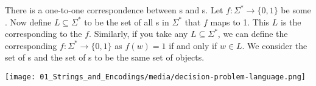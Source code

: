 \begin{important} \label{important:Correspondence-between-decision-problems-and-languages}
There is a one-to-one correspondence between s and s. Let $f:\Sigma^* \to \{0,1\}$ be some . Now define $L \subseteq \Sigma^*$ to be the set of all s in $\Sigma^*$ that $f$ maps to 1. This $L$ is the  corresponding to the  $f$. Similarly, if you take any  $L \subseteq \Sigma^*$, we can define the corresponding  $f:\Sigma^* \to \{0,1\}$ as $f(w) = 1$ if and only if $w \in L$. We consider the set of s and the set of s to be the same set of objects.
\begin{center}
    \texttt{[image: 01\_Strings\_and\_Encodings/media/decision-problem-language.png]}
\end{center}
\end{important}






